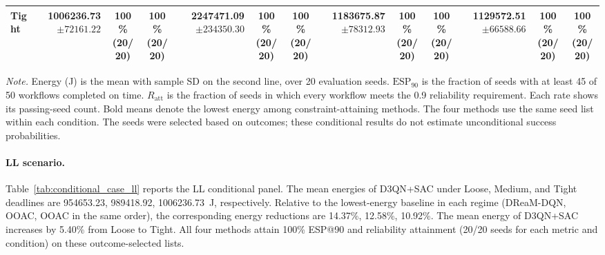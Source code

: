 \begin{table}[!t]
\begin{tabular}{@{}l*{4}{rcc}@{}}
Tight & \shortstack[r]{\textbf{1006236.73}\\$\pm 72161.22$} & \shortstack[c]{100\%\\(20/20)} & \shortstack[c]{100\%\\(20/20)} & \shortstack[r]{2247471.09\\$\pm 234350.30$} & \shortstack[c]{100\%\\(20/20)} & \shortstack[c]{100\%\\(20/20)} & \shortstack[r]{1183675.87\\$\pm 78312.93$} & \shortstack[c]{100\%\\(20/20)} & \shortstack[c]{100\%\\(20/20)} & \shortstack[r]{1129572.51\\$\pm 66588.66$} & \shortstack[c]{100\%\\(20/20)} & \shortstack[c]{100\%\\(20/20)} \\
\bottomrule
\end{tabular}
\par\vspace{3pt}
\parbox{\textwidth}{\footnotesize
\textit{Note.} Energy (J) is the mean with sample SD on the second line, over 20 evaluation seeds.
$\mathrm{ESP}_{90}$ is the fraction of seeds with at least 45 of 50 workflows completed on time.
$R_{\mathrm{att}}$ is the fraction of seeds in which every workflow meets the 0.9 reliability requirement.
Each rate shows its passing-seed count. Bold means denote the lowest energy among constraint-attaining methods.
The four methods use the same seed list within each condition.
The seeds were selected based on outcomes; these conditional results do not estimate unconditional success probabilities.}
\endgroup
\end{table}

\paragraph{LL scenario.}
Table~\ref{tab:conditional_case_ll} reports the LL conditional panel. The mean energies of D3QN+SAC under Loose, Medium, and Tight deadlines are 954653.23, 989418.92, 1006236.73~J, respectively. Relative to the lowest-energy baseline in each regime (DReaM-DQN, OOAC, OOAC in the same order), the corresponding energy reductions are 14.37\%, 12.58\%, 10.92\%. The mean energy of D3QN+SAC increases by 5.40\% from Loose to Tight. All four methods attain 100\% ESP@90 and reliability attainment (20/20 seeds for each metric and condition) on these outcome-selected lists.

